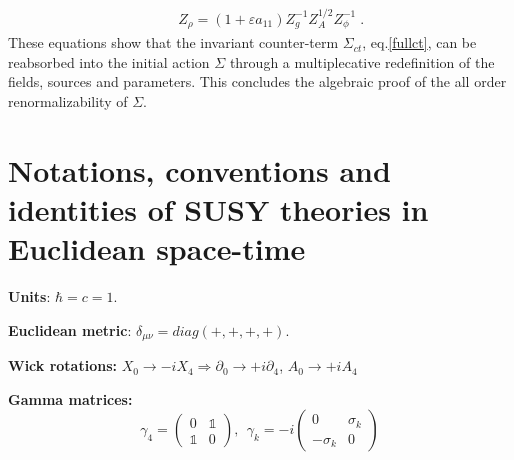 \begin{appendix}
\begin{eqnarray}
&&
Z_{\rho} = (1+\varepsilon a_{11})Z^{-1}_{g}Z^{1/2}_{A}Z^{-1}_{\phi}\;.
\end{eqnarray}
These equations show that the invariant  counter-term  $\Sigma_{ct}$, eq.\eqref{fullct}, can be reabsorbed into the initial action $\Sigma$ through a multiplecative redefinition of the fields, sources and parameters. This concludes the algebraic proof of the all order renormalizability of $\Sigma$. 


































\chapter{Notations, conventions and identities of SUSY theories in Euclidean space-time}
\label{notations}









\noindent
\textbf{Units}: $\hbar=c=1$.


\noindent
\textbf{Euclidean metric}: $\delta_{\mu\nu}=diag(+,+,+,+)$.

\noindent
\textbf{Wick rotations:} $X_0\rightarrow -iX_4\Rightarrow\partial_0\rightarrow+i\partial_4$, $A_0\rightarrow+iA_4$

\noindent
\textbf{Gamma matrices:}
\[\gamma_4=\left( \begin{array}{cc}
0 & \mathbb{1} \\
\mathbb{1} & 0 \end{array} \right),~~
\gamma_k=-i\left( \begin{array}{cc} 0 & \sigma_k \\ -\sigma_k & 0 \end{array} \right)\]


\end{appendix}
